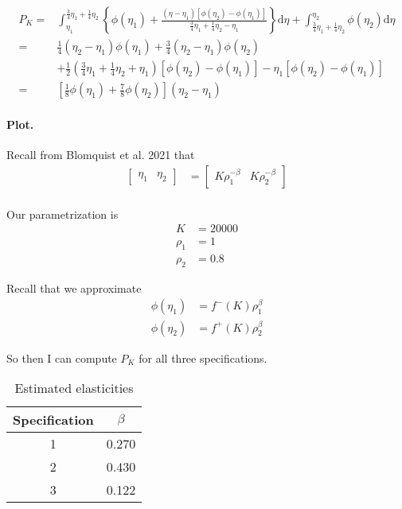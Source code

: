 \documentclass{article}
\begin{document}
\begin{solution}
\[
\begin{aligned}P_{K}= & \int_{\eta_{1}}^{\frac{3}{4}\eta_{1}+\frac{1}{4}\eta_{2}}\left\{ \phi\left(\eta_{1}\right)+\frac{\left(\eta-\eta_{1}\right)\left[\phi\left(\eta_{2}\right)-\phi\left(\eta_{1}\right)\right]}{\frac{3}{4}\eta_{1}+\frac{1}{4}\eta_{2}-\eta_{1}}\right\} \mathrm{d}\eta+\int_{\frac{3}{4}\eta_{1}+\frac{1}{4}\eta_{2}}^{\eta_{2}}\phi\left(\eta_{2}\right)\mathrm{d}\eta\\
= & \frac{1}{4}\left(\eta_{2}-\eta_{1}\right)\phi\left(\eta_{1}\right)+\frac{3}{4}\left(\eta_{2}-\eta_{1}\right)\phi\left(\eta_{2}\right)\\
 & +\frac{1}{2}\left(\frac{3}{4}\eta_{1}+\frac{1}{4}\eta_{2}+\eta_{1}\right)\left[\phi\left(\eta_{2}\right)-\phi\left(\eta_{1}\right)\right]-\eta_{1}\left[\phi\left(\eta_{2}\right)-\phi\left(\eta_{1}\right)\right]\\
= & {\left[\frac{1}{8}\phi\left(\eta_{1}\right)+\frac{7}{8}\phi\left(\eta_{2}\right)\right]\left(\eta_{2}-\eta_{1}\right)}
\end{aligned}
\]


\paragraph{Plot.}

Recall from Blomquist et al. 2021 that 
\begin{align*}
\begin{bmatrix}\eta_{1} & \eta_{2}\end{bmatrix} & =\begin{bmatrix}K\rho_{1}^{-\beta} & K\rho_{2}^{-\beta}\end{bmatrix}\\
\end{align*}

Our parametrization is 
\begin{align*}
K & =20000\\
\rho_{1} & =1\\
\rho_{2} & =0.8
\end{align*}

Recall that we approximate
\begin{align*}
\phi\left(\eta_{1}\right) & =f^{-}\left(K\right)\rho_{1}^{\beta}\\
\phi\left(\eta_{2}\right) & =f^{+}\left(K\right)\rho_{2}^{\beta}
\end{align*}

So then I can compute $P_{K}$ for all three specifications. 


\begin{table}
\centering
\begin{tabular}{|c|c|}
\hline 
Specification & $\beta$\tabularnewline
\hline 
\hline 
1 & 0.270\tabularnewline
\hline 
2 & 0.430\tabularnewline
\hline 
3 & 0.122\tabularnewline
\hline 
\end{tabular}

\caption{Estimated elasticities}
\end{table}


\end{solution}
\end{document}
